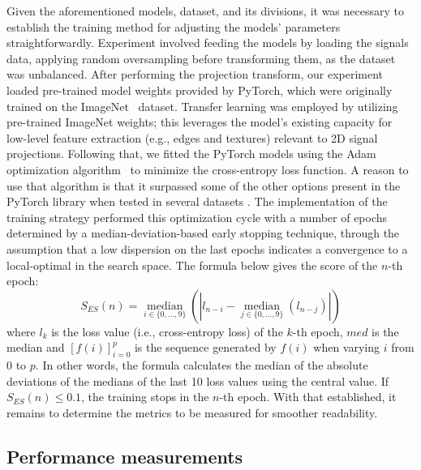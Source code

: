 \documentclass[final,3p,times,twocolumn]{elsarticle}
\begin{document}
Given the aforementioned models, dataset, and its divisions, it was necessary to establish the training method for adjusting the models' parameters straightforwardly.
Experiment involved feeding the models by loading the signals data, applying random oversampling before transforming them, as the dataset was unbalanced. After performing the projection transform, our experiment loaded pre-trained model weights provided by PyTorch, which were originally trained on the ImageNet~\cite{ImageNet} dataset.
Transfer learning was employed by utilizing pre-trained ImageNet weights; this leverages the model's existing capacity for low-level feature extraction (e.g., edges and textures) relevant to 2D signal projections.
Following that, we fitted the PyTorch models using the Adam optimization algorithm~\cite{Adam} to minimize the cross-entropy loss function. A reason to use that algorithm is that it surpassed some of the other options present in the PyTorch library when tested in several datasets \cite{Adam}. The implementation of the training strategy performed this optimization cycle with a number of epochs determined by a median-deviation-based early stopping technique, through the assumption that a low dispersion on the last epochs indicates a convergence to a local-optimal in the search space. The formula below gives the score of the $n$-th epoch:
\begin{equation}
    S_{ES}(n) = \operatorname*{median}_{i \in \{0, \dots, 9\}} \left( \left| l_{n-i} - \operatorname*{median}_{j \in \{0, \dots, 9\}} (l_{n-j}) \right| \right)
\end{equation}
\noindent where $l_k$ is the loss value (i.e., cross-entropy loss) of the $k$-th epoch, ${med}$ is the median and $[f(i)]_{i=0}^p$ is the sequence generated by $f(i)$ when varying $i$ from $0$ to $p$. In other words, the formula calculates the median of the absolute deviations of the medians of the last 10 loss values using the central value. If $S_{ES}(n) \leq 0.1$, the training stops in the $n$-th epoch. With that established, it remains to determine the metrics to be measured for smoother readability.

\subsection{Performance measurements}
\end{document}
